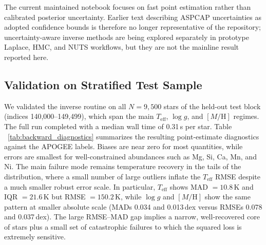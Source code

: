 \documentclass[preprint]{aastex701-1/aastex701}
\begin{document}
The current maintained notebook focuses on fast point estimation rather than calibrated
posterior uncertainty. Earlier text describing ASPCAP uncertainties as adopted confidence
bounds is therefore no longer representative of the repository; uncertainty-aware inverse
methods are being explored separately in prototype Laplace, HMC, and NUTS workflows, but
they are not the mainline result reported here.

\subsection{Validation on Stratified Test Sample}
\label{subsec:map_results}
We validated the inverse routine on all $N=9{,}500$ stars of the held-out test block
(indices 140{,}000--149{,}499), which span the main $T_\mathrm{eff}$, $\log g$, and
$[M/\mathrm{H}]$ regimes. The full run
completed with a median wall time of 0.31\,s per star. Table
~\ref{tab:backward_diagnostics} summarizes the resulting point-estimate diagnostics against
the APOGEE labels. Biases are near zero for most quantities, while errors are smallest for
well-constrained abundances such as Mg, Si, Ca, Mn, and Ni. The main failure mode remains
temperature recovery in the tails of the distribution, where a small number of large
outliers inflate the $T_\mathrm{eff}$ RMSE despite a much smaller robust error scale. In
particular, $T_\mathrm{eff}$ shows MAD $=10.8$\,K and IQR $=21.6$\,K but
RMSE $=150.2$\,K, while $\log g$ and $[M/\mathrm{H}]$ show the same pattern at smaller
absolute scale (MADs 0.034 and 0.013\,dex versus RMSEs 0.078 and 0.037\,dex). The large
RMSE--MAD gap implies a narrow, well-recovered core of stars plus a small set of
catastrophic failures to which the squared loss is extremely sensitive.
\end{document}
